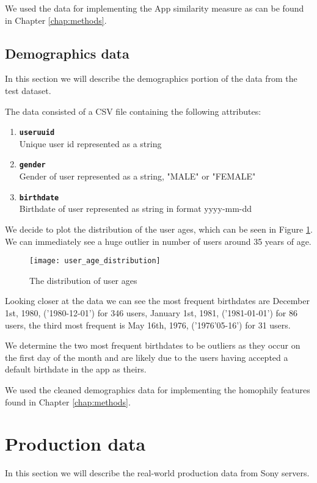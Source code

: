 We used the data for implementing the App similarity measure as can be found in Chapter \ref{chap:methods}.

\subsection{Demographics data}
In this section we will describe the demographics portion of the data from the test dataset.

The data consisted of a CSV file containing the following attributes:
\begin{enumerate}
\item \texttt{\textbf{useruuid}}\\Unique user id represented as a string
\item \texttt{\textbf{gender}}\\Gender of user represented as a string, "MALE" or "FEMALE"
\item \texttt{\textbf{birthdate}}\\Birthdate of user represented as string in format yyyy-mm-dd
\end{enumerate}
We decide to plot the distribution of the user ages, which can be seen in Figure \ref{fig:user_age_distribution}. We can immediately see a huge outlier in number of users around 35 years of age.

\begin{figure}[H]
    \hspace*{-1.5cm}
    \centering
    \texttt{[image: user\_age\_distribution]}
    \caption{The distribution of user ages}
    \label{fig:user_age_distribution}
\end{figure}
Looking closer at the data we can see the most frequent birthdates are December 1st, 1980, ('1980-12-01') for 346 users, January 1st, 1981, ('1981-01-01') for 86 users, the third most frequent is May 16th, 1976, ('1976'05-16') for 31 users.

We determine the two most frequent birthdates to be outliers as they occur on the first day of the month and are likely due to the users having accepted a default birthdate in the app as theirs.

We used the cleaned demographics data for implementing the homophily features found in Chapter \ref{chap:methods}.

\section{Production data}
In this section we will describe the real-world production data from Sony servers.

